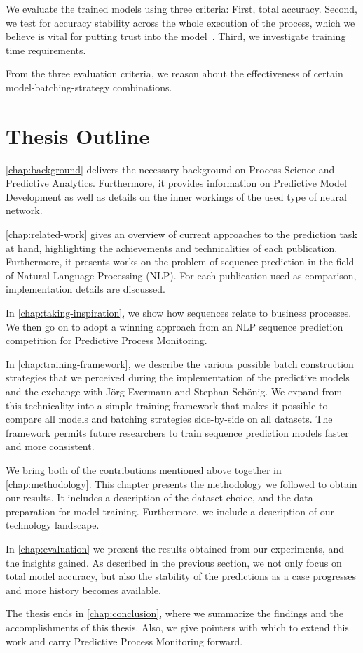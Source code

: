 We evaluate the trained models using three criteria: First, total accuracy. Second, we test for accuracy stability across the whole execution of the process, which we believe is vital for putting trust into the model~\cite{francescomarino2015, boehmer2018probability}. Third, we investigate training time requirements.

From the three evaluation criteria, we reason about the effectiveness of certain model-batching-strategy combinations.

\section{Thesis Outline}\label{sec:intro:outline}
\autoref{chap:background} delivers the necessary background on Process Science and Predictive Analytics. Furthermore, it provides information on Predictive Model Development as well as details on the inner workings of the used type of neural network.

\autoref{chap:related-work} gives an overview of current approaches to the prediction task at hand, highlighting the achievements and technicalities of each publication. Furthermore, it presents works on the problem of sequence prediction in the field of Natural Language Processing (NLP). For each publication used as comparison, implementation details are discussed.

In \autoref{chap:taking-inspiration}, we show how sequences relate to business processes.
We then go on to adopt a winning approach from an NLP sequence prediction competition for Predictive Process Monitoring.

In \autoref{chap:training-framework}, we describe the various possible batch construction strategies that we perceived during the implementation of the predictive models and the exchange with Jörg Evermann and Stephan Schönig. We expand from this technicality into a simple training framework that makes it possible to compare all models and batching strategies side-by-side on all datasets. The framework permits future researchers to train sequence prediction models faster and more consistent.

We bring both of the contributions mentioned above together in \autoref{chap:methodology}.
This chapter presents the methodology we followed to obtain our results. It includes a description of the dataset choice,
and the data preparation for model training. Furthermore, we include a description of our technology landscape.

In \autoref{chap:evaluation} we present the results obtained from our experiments, and the insights gained. As described in the previous section, we not only focus on total model accuracy, but also the stability of the predictions as a case progresses and more history becomes available.

The thesis ends in \autoref{chap:conclusion}, where we summarize the findings and the accomplishments of this thesis. Also, we give pointers with which to extend this work and carry Predictive Process Monitoring forward.
